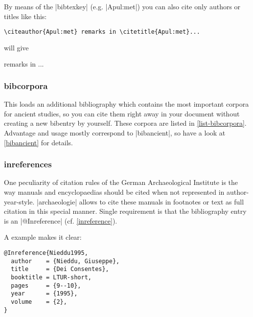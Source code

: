 \documentclass[a4paper,
10pt,
greek,
french,
spanish,
italian,
ngerman,
english
]{ltxdoc}
\begin{document}
\begin{refsection}
By means of the |bibtexkey| (e.g. |Apul:met|) you can also cite only authors or titles like this: 

\begin{lstlisting}
\citeauthor{Apul:met} remarks in \citetitle{Apul:met}...
\end{lstlisting}

will give

\citeauthor{Apul:met} remarks in ...
\end{refsection}


\subsubsection{bibcorpora}\label{bibcorpora}
This loads an additional bibliography which contains the most important corpora for ancient studies, so you can cite them right away in your document without creating a new bibentry by yourself. 
These corpora are listed in \cref{list-bibcorpora}. 
Advantage and usage mostly correspond to |bibancient|, so have a look at \cref{bibancient} for details.

\subsubsection{inreferences}\label{inreferences}
One peculiarity of citation rules of the German Archaeological Institute is the way manuals and encyclopaedias should be cited when not represented in author-year-style. 
|archaeologie| allows to cite these manuals in footnotes or text as full citation in this special manner.
Single requirement is that the bibliography entry is an |@Inreference|  (cf. \cref{inreference}).
 
A example makes it clear: 
\begin{lstlisting}[style=bibentry,label=Nieddu1995,caption={{@}Inreference\{Nieddu1995,…\} }]
@Inreference{Nieddu1995,
  author    = {Nieddu, Giuseppe},
  title     = {Dei Consentes},
  booktitle = LTUR-short,
  pages     = {9--10},
  year      = {1995},
  volume    = {2},
}
\end{lstlisting}
\end{document}
